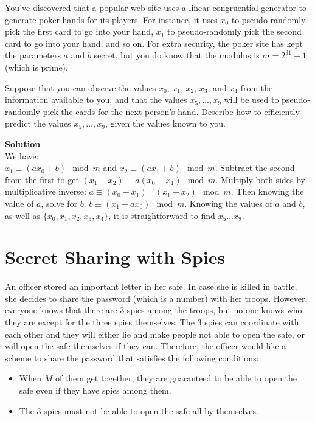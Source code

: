 \documentclass[11pt]{article}
\newcommand*{\Question}[1]{\section{#1}}
\begin{document}
You've discovered that a popular web site uses a linear congruential generator to generate poker hands for its players.  For instance, it uses $x_0$ to pseudo-randomly pick the first card to go into your hand, $x_1$ to pseudo-randomly pick the second card to go into your hand, and so on. For extra security, the poker site has kept the parameters $a$ and $b$ secret, but you do know that the modulus is $m=2^{31}-1$ (which is prime).

Suppose that you can observe the values $x_0$, $x_1$, $x_2$, $x_3$, and $x_4$ from the information available to you, and that the values $x_5,\dots,x_9$ will be used to pseudo-randomly pick the cards for the next person's hand. Describe how to efficiently predict the values $x_5,\dots,x_9$, given the values known to you.
\begin{mdframed} \textbf{Solution} \\
We have: \\
$x_1 \equiv (ax_0+b) \mod m$ and $x_2 \equiv (ax_1+b) \mod m$. Subtract the second from the first to get $(x_1-x_2) \equiv a(x_0-x_1) \mod m$. Multiply both sides by multiplicative inverse: $a \equiv (x_0-x_1)^{-1}(x_1-x_2) \mod m$. Then knowing the value of $a$, solve for $b$. $b \equiv (x_1-ax_0) \mod m$. Knowing the values of $a$ and $b$, as well as $\{x_0,x_1,x_2,x_3,x_4\}$, it is straightforward to find $x_5...x_9$.
\end{mdframed}


\Question{Secret Sharing with Spies}

An officer stored an important letter in her safe. In case she is
killed in battle, she decides to share the password (which is a number)
with her troops. However, everyone knows that there are 3 spies among
the troops, but no one knows who they are except for the three spies
themselves. The 3 spies can coordinate with each other and they will
either lie and make people not able to open the safe, or will open the
safe themselves if they can. Therefore, the officer would like a
scheme to share the password that satisfies the following conditions:
\begin{itemize}
  \item When $M$ of them get together, they are guaranteed to be
          able to open the safe even if they have spies among them.
  \item The 3 spies must not be able to open the safe all by themselves.
\end{itemize}
\end{document}
